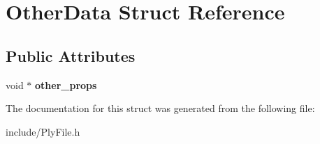 \hypertarget{structOtherData}{\section{Other\-Data Struct Reference}
\label{structOtherData}
}
\subsection*{Public Attributes}
\begin{DoxyCompactItemize}
\item 
\hypertarget{structOtherData_a21c6a90664f23db87f2e8a91c87b1ac1}{void $\ast$ {\bfseries other\-\_\-props}}\label{structOtherData_a21c6a90664f23db87f2e8a91c87b1ac1}

\end{DoxyCompactItemize}


The documentation for this struct was generated from the following file\-:\begin{DoxyCompactItemize}
\item 
include/Ply\-File.\-h\end{DoxyCompactItemize}
